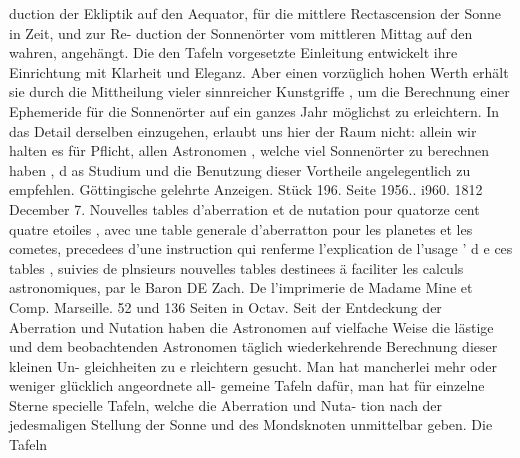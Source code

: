 \documentclass[12pt,a4paper]{article}
\begin{document}
duction der Ekliptik auf den Aequator, für die mittlere Rectascension der Sonne in Zeit, und zur Re-\newline
duction der Sonnenörter vom mittleren Mittag auf den wahren, angehängt.\newline
Die den Tafeln vorgesetzte Einleitung entwickelt ihre Einrichtung mit Klarheit und Eleganz.\newline
Aber einen vorzüglich hohen Werth erhält sie durch die Mittheilung vieler sinnreicher Kunstgriffe , um\newline
die Berechnung einer Ephemeride für die Sonnenörter auf ein ganzes Jahr möglichst zu erleichtern.\newline
In das Detail derselben einzugehen, erlaubt uns hier der Raum nicht: allein wir halten es für Pflicht,\newline
allen Astronomen , welche viel Sonnenörter zu berechnen haben , d as Studium und die Benutzung dieser\newline
Vortheile angelegentlich zu empfehlen.\newline
Göttingische gelehrte Anzeigen. Stück 196. Seite 1956.. i960. 1812 December 7.\newline
Nouvelles tables d'aberration et de nutation pour quatorze cent quatre etoiles , avec une table generale\newline
d'aberratton pour les planetes et les cometes, precedees d'une instruction qui renferme l'explication de l'usage\newline
' d e ces tables , suivies de plnsieurs nouvelles tables destinees ä faciliter les calculs astronomiques, par le Baron\newline
DE Zach. De l'imprimerie de Madame Mine et Comp. Marseille. 52 und 136 Seiten in Octav.\newline
Seit der Entdeckung der Aberration und Nutation haben die Astronomen auf vielfache Weise\newline
die lästige und dem beobachtenden Astronomen täglich wiederkehrende Berechnung dieser kleinen Un-\newline
gleichheiten zu e rleichtern gesucht. Man hat mancherlei mehr oder weniger glücklich angeordnete all-\newline
gemeine Tafeln dafür, man hat für einzelne Sterne specielle Tafeln, welche die Aberration und Nuta-\newline
tion nach der jedesmaligen Stellung der Sonne und des Mondsknoten unmittelbar geben. Die Tafeln\newline
\end{document}
